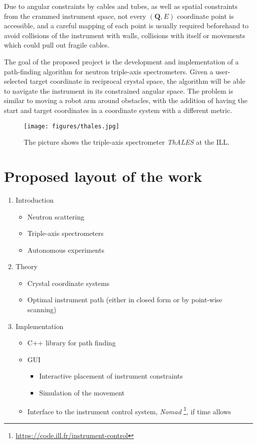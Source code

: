 \documentclass[english, notitlepage, groupedaddress, superscriptaddress]{revtex4-1}
\begin{document}
Due to angular constraints by cables and tubes, as well as spatial constraints from the crammed instrument space, 
not every $\left( \bm{Q}, E \right)$ coordinate point is accessible, and a careful mapping of each point is
usually required beforehand to avoid collisions of the instrument with walls, collisions with itself or movements
which could pull out fragile cables.

The goal of the proposed project is the development and implementation of a path-finding algorithm for 
neutron triple-axis spectrometers. Given a user-selected target coordinate in reciprocal crystal space, 
the algorithm will be able to navigate the instrument in its constrained angular space. The problem is similar to 
moving a robot arm around obstacles, with the addition of having the start and target coordinates in a 
coordinate system with a different metric.

\begin{figure}[ht]
	\begin{centering}
	\texttt{[image: figures/thales.jpg]}
	\end{centering}
	\caption{The picture shows the triple-axis spectrometer \textit{ThALES} \cite{thales} at the ILL.}
	\label{fig:tas}
\end{figure}



\section{Proposed layout of the work}

\begin{enumerate}
	\item Introduction
		\begin{itemize}
			\item Neutron scattering
			\item Triple-axis spectrometers
			\item Autonomous experiments
		\end{itemize}
	\item Theory
		\begin{itemize}
			\item Crystal coordinate systems
			\item Optimal instrument path (either in closed form or by point-wise scanning)
		\end{itemize}
	\item Implementation
		\begin{itemize}
			\item C++ library for path finding
			\item GUI
				\begin{itemize}
					\item Interactive placement of instrument constraints
					\item Simulation of the movement
				\end{itemize}
			\item Interface to the instrument control system, \textit{Nomad} \footnote{\url{https://code.ill.fr/instrument-control}}, if time allows
		\end{itemize}
\end{enumerate}


\end{document}
